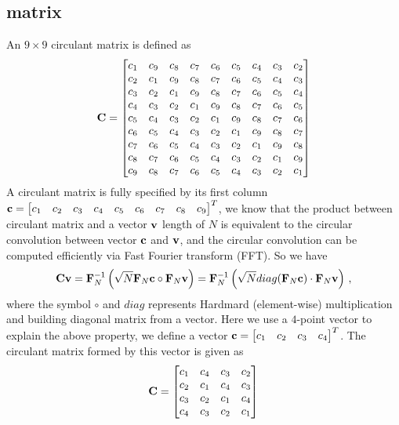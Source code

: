 \documentclass[revised,endfloat]{geophysics}
\begin{document}
\subsection{   matrix}
An $9 \times 9$ circulant matrix is defined as
\begin{equation}
{\bf C} = 
\begin{bmatrix}
c_1 & c_9 & c_8 & c_7 & c_6 & c_5 &  c_4 & c_3 & c_2 \\ 
c_2 & c_1 & c_9 & c_8 & c_7 & c_6 &  c_5 & c_4 & c_3 \\ 
c_3 & c_2 & c_1 & c_9 & c_8 & c_7 &  c_6 & c_5 & c_4 \\ 
c_4 & c_3 & c_2 & c_1 & c_9 & c_8 &  c_7 & c_6 & c_5 \\ 
c_5 & c_4 & c_3 & c_2 & c_1 & c_9 &  c_8 & c_7 & c_6 \\ 
c_6 & c_5 & c_4 & c_3 & c_2 & c_1 &  c_9 & c_8 & c_7 \\ 
c_7 & c_6 & c_5 & c_4 & c_3 & c_2 &  c_1 & c_9 & c_8 \\ 
c_8 & c_7 & c_6 & c_5 & c_4 & c_3 &  c_2 & c_1 & c_9 \\ 
c_9 & c_8 & c_7 & c_6 & c_5 & c_4 &  c_3 & c_2 & c_1 \\ 
\end{bmatrix}
\end{equation} 
A circulant matrix is fully specified by its first column ${\bf c} = \begin{bmatrix}
c_1 & c_2 &  c_3 &  c_4 &  c_5 &  c_6 &  c_7 &  c_8 &  c_9  \end{bmatrix}^T$, we know that the product between circulant matrix and a vector ${\bf v}$ length of $N$ is equivalent to the circular convolution between vector ${\bf c}$ and ${\bf v}$, and the circular convolution can be computed efficiently via Fast Fourier transform (FFT). So we have
\begin{equation}
{\bf Cv} = {\bf F}_N^{-1} \left(  \sqrt{N}{\bf F}_N {\bf c} \circ {\bf F}_N {\bf v} \right)  =  {\bf F}_N^{-1} \left( \sqrt{N} diag({\bf F}_N {\bf c}) \cdot {\bf F}_N {\bf v} \right) \,,
\label{circ_times_vector}
\end{equation}
where the symbol $\circ$ and $diag$ represents Hardmard (element-wise) multiplication and building diagonal matrix from a vector.
Here we use a $4$-point vector to explain the above property, we define a vector ${\bf c} = \begin{bmatrix} c_1 & c_2 &c_3 & c_4\end{bmatrix}^T$. The circulant matrix formed by this vector is given as
\begin{equation}
{\bf C} = 
\begin{bmatrix}
c_1 & c_4 & c_3 & c_2  \\ 
c_2 & c_1 & c_4 & c_3  \\ 
c_3 & c_2 & c_1 & c_4  \\ 
c_4 & c_3 & c_2 & c_1 
\end{bmatrix}
\end{equation} 
\end{document}
